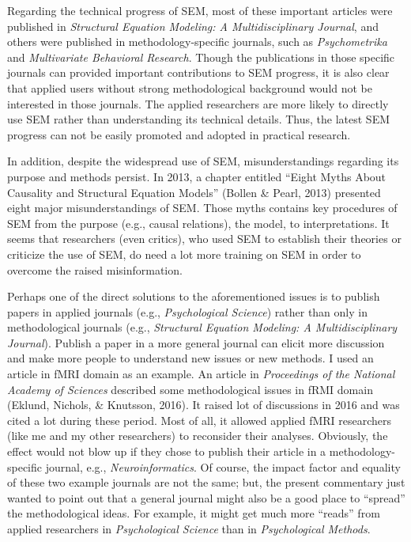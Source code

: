 \documentclass[jou]{apa6}
\theoremstyle{definition}
\theoremstyle{definition}
\theoremstyle{definition}
\theoremstyle{remark}
\begin{document}
Regarding the technical progress of SEM, most of these important
articles were published in \emph{Structural Equation Modeling: A
Multidisciplinary Journal}, and others were published in
methodology-specific journals, such as \emph{Psychometrika} and
\emph{Multivariate Behavioral Research}. Though the publications in
those specific journals can provided important contributions to SEM
progress, it is also clear that applied users without strong
methodological background would not be interested in those journals. The
applied researchers are more likely to directly use SEM rather than
understanding its technical details. Thus, the latest SEM progress can
not be easily promoted and adopted in practical research.

In addition, despite the widespread use of SEM, misunderstandings
regarding its purpose and methods persist. In 2013, a chapter entitled
\enquote{Eight Myths About Causality and Structural Equation Models}
(Bollen \& Pearl, 2013) presented eight major misunderstandings of SEM.
Those myths contains key procedures of SEM from the purpose (e.g.,
causal relations), the model, to interpretations. It seems that
researchers (even critics), who used SEM to establish their theories or
criticize the use of SEM, do need a lot more training on SEM in order to
overcome the raised misinformation.

Perhaps one of the direct solutions to the aforementioned issues is to
publish papers in applied journals (e.g., \emph{ Psychological Science})
rather than only in methodological journals (e.g., \emph{Structural
Equation Modeling: A Multidisciplinary Journal}). Publish a paper in a
more general journal can elicit more discussion and make more people to
understand new issues or new methods. I used an article in fMRI domain
as an example. An article in \emph{Proceedings of the National Academy
of Sciences} described some methodological issues in fRMI domain
(Eklund, Nichols, \& Knutsson, 2016). It raised lot of discussions in
2016 and was cited a lot during these period. Most of all, it allowed
applied fMRI researchers (like me and my other researchers) to
reconsider their analyses. Obviously, the effect would not blow up if
they chose to publish their article in a methodology-specific journal,
e.g., \emph{Neuroinformatics}. Of course, the impact factor and equality
of these two example journals are not the same; but, the present
commentary just wanted to point out that a general journal might also be
a good place to \enquote{spread} the methodological ideas. For example,
it might get much more \enquote{reads} from applied researchers in
\emph{Psychological Science} than in \emph{Psychological Methods}.
\end{document}
